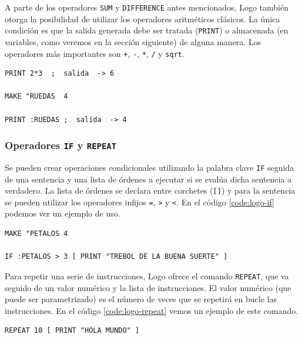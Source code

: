A parte de los operadores \texttt{SUM} y \texttt{DIFFERENCE} antes mencionados, Logo también otorga la posibilidad de utilizar los operadores aritméticos clásicos. La única condición es que la salida generada debe ser tratada (\texttt{PRINT}) o almacenada (en variables, como veremos en la sección siguiente) de alguna manera. Los operadores más importantes son \texttt{+}, \texttt{-}, \texttt{*}, \texttt{/} y \texttt{sqrt}.

\begin{lstlisting}[language={Logo}, label={code:logo-operadores-aritmeticos}, caption=Ejemplo de uso de operadores aritméticos en el lenguaje Logo.]
PRINT 2*3  ;  salida  -> 6

MAKE "RUEDAS  4

PRINT :RUEDAS ;  salida  -> 4
\end{lstlisting}


\subsubsection*{Operadores \texttt{IF} y \texttt{REPEAT}}

Se pueden crear operaciones condicionales utilizando la palabra clave \texttt{IF} seguida de una sentencia y una lista de órdenes a ejecutar si se evalúa dicha sentencia a verdadero. La lista de órdenes se declara entre corchetes (\texttt{[]}) y para la sentencia se pueden utilizar los operadores infijos \texttt{=}, \texttt{>} y \texttt{<}. En el código \ref{code:logo-if} podemos ver un ejemplo de uso.

\begin{lstlisting}[language=Logo,label={code:logo-if}, caption=Condiciones en el lenguaje logo con el operador \texttt{IF}.]
MAKE "PETALOS 4

IF :PETALOS > 3 [ PRINT "TREBOL DE LA BUENA SUERTE" ]
\end{lstlisting}

Para repetir una serie de instrucciones, Logo ofrece el comando \texttt{REPEAT}, que va seguido de un valor numérico y la lista de instrucciones. El valor numérico (que puede ser parametrizado) es el número de veces que se repetirá en bucle las instrucciones. En el código \ref{code:logo-repeat} vemos un ejemplo de este comando.


\begin{lstlisting}[language=Logo,label={code:logo-repeat}, caption=Condiciones en el lenguaje logo con el operador \texttt{IF}.]
REPEAT 10 [ PRINT "HOLA MUNDO" ]
\end{lstlisting}


